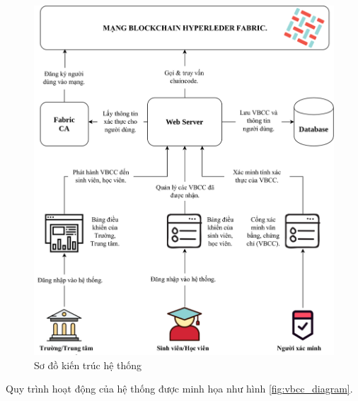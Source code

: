 \begin{figure}[H]
\centering
\includegraphics[width=.9\linewidth]{img/vbcc_phanmem.jpg}
\caption{Sơ đồ kiến trúc hệ thống}
\label{fig:vbcc_phanmem}
\end{figure}

Quy trình hoạt động của hệ thống được minh họa như hình \ref{fig:vbcc_diagram}.

